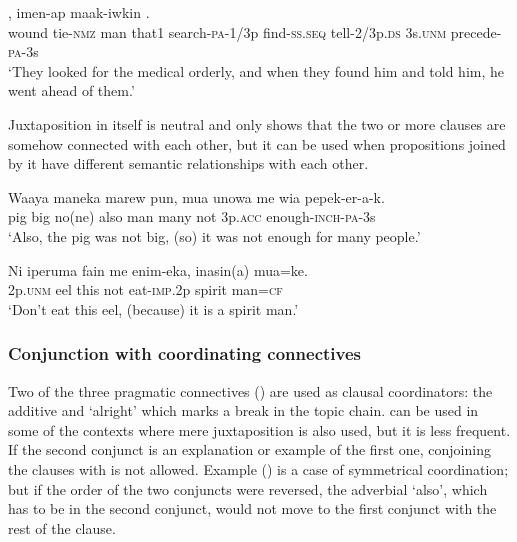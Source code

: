 
\ea%
\label{ex:x1371}
\gll {}        ,  imen-ap   maak-iwkin    .\\
 wound  tie-\textsc{nmz}  man  that1  search-\textsc{pa}-1/3p  find-\textsc{ss}.\textsc{seq} tell-2/3p.\textsc{ds}  3s.\textsc{unm}  precede-\textsc{pa}-3s\\ 
\glt`They looked for the medical orderly, and when they found him and told him, he went ahead of them.'
\z


Juxtaposition in itself is neutral and only shows that the two or more clauses are somehow connected with each other, but it can be used when propositions joined by it have different semantic relationships with each other.

\ea%
\label{ex:x1404}
\gll Waaya  maneka  marew  pun,  mua  unowa  me  wia pepek-er-a-k.\\
 pig  big  no(ne)  also  man  many  not  3p.\textsc{acc} enough-\textsc{inch}-\textsc{pa}-3s\\
\glt`Also, the pig was not big, (so) it was not enough for many people.'
\z


\ea%
\label{ex:x1425}
\gll Ni  iperuma  fain  me  enim-eka,  inasin(a)  mua=ke. \\
2p.\textsc{unm}  eel  this  not  eat-\textsc{imp}.2p  spirit  man=\textsc{cf}      \\
\glt`Don't eat this eel, (because) it is a spirit man.'
\z


\subsubsection[Conjunction with coordinating connectives]{Conjunction with coordinating connectives}

Two of the three pragmatic connectives () are used as clausal coordinators: the additive   and  `alright' which marks a break in the topic chain.  can be used in some of the contexts where mere juxtaposition is also used, but it is less frequent. If the second conjunct is an explanation or example of the first one, conjoining the clauses with  is not allowed. Example () is a case of symmetrical coordination; but if the order of the two conjuncts were reversed, the adverbial  `also', which has to be in the second conjunct, would not move to the first conjunct with the rest of the clause.

